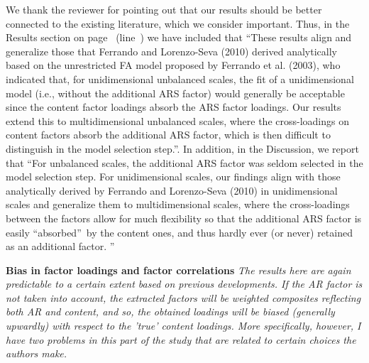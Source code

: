 \documentclass[a4paper]{article}
\begin{document}
We thank the reviewer for pointing out that our results should be better connected to the existing literature, which we consider important. Thus, in the Results section on page~\pageref{refpage:R1Mj2a} (line~) we have included that \textquotedblleft These results align and generalize those that Ferrando and Lorenzo-Seva (2010) derived analytically based on the unrestricted FA model proposed by Ferrando et al. (2003), who indicated that, for unidimensional unbalanced scales, the fit of a unidimensional model (i.e., without the additional ARS factor) would generally be acceptable since the content factor loadings absorb the ARS factor loadings. Our results extend this to multidimensional unbalanced scales, where the cross-loadings on content factors absorb the additional ARS factor, which is then difficult to distinguish in the model selection step.\textquotedblright. In addition, in the Discussion, we report that \textquotedblleft For unbalanced scales, the additional ARS factor was seldom selected in the model selection step. For unidimensional scales, our findings align with those analytically derived by Ferrando and Lorenzo-Seva (2010) in unidimensional scales and generalize them to multidimensional scales, where the cross-loadings between the factors allow for much flexibility so that the additional ARS factor is easily \textquotedblleft absorbed\textquotedblright\, by the content ones, and thus hardly ever (or never) retained as an additional factor. \textquotedblright


\textbf{Bias in factor loadings and factor correlations}
\textit{The results here are again predictable to a certain extent based on previous developments. If the AR factor is not taken into account, the extracted factors will be weighted composites reflecting both AR and content, and so, the obtained loadings will be biased (generally upwardly) with respect to the 'true' content loadings.  More specifically, however, I have two problems in this part of the study that are related to certain choices the authors make.}
\end{document}
